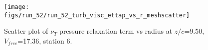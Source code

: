 \begin{figure}[H]
\centering
\texttt{[image: figs/run\_52/run\_52\_turb\_visc\_ettap\_vs\_r\_meshscatter]}
\caption{Scatter plot of $\nu_T$ pressure relaxation term vs radius at $z/c$=9.50, $V_{free}$=17.36, station 6.}
\label{fig:run_52_turb_visc_ettap_vs_r_meshscatter}
\end{figure}



